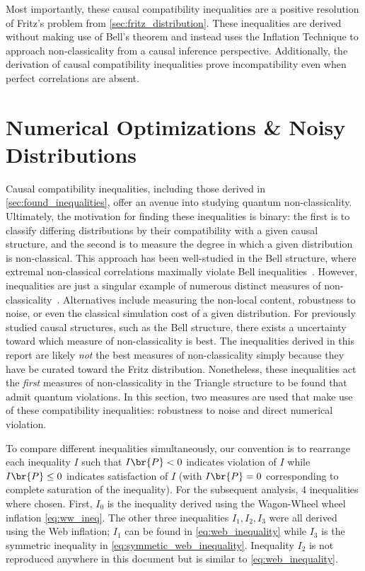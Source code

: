 \documentclass[aps, 10pt, english, twoside, pra, nofootinbib, tightenlines, longbibliography, superscriptaddress]{revtex4-1}
\begin{document}
    Most importantly, these causal compatibility inequalities are a positive resolution of Fritz's problem from \cref{sec:fritz_distribution}. These inequalities are derived without making use of Bell's theorem and instead uses the Inflation Technique to approach non-classicality from a causal inference perspective. Additionally, the derivation of causal compatibility inequalities prove incompatibility even when perfect correlations are absent.

    \section{Numerical Optimizations \& Noisy Distributions}
    \label{sec:violations_noise}
    Causal compatibility inequalities, including those derived in \cref{sec:found_inequalities}, offer an avenue into studying quantum non-classicality. Ultimately, the motivation for finding these inequalities is binary: the first is to classify differing distributions by their compatibility with a given causal structure, and the second is to measure the degree in which a given distribution is non-classical. This approach has been well-studied in the Bell structure, where extremal non-classical correlations maximally violate Bell inequalities~\cite{PR_1995}. However, inequalities are just a singular example of numerous distinct measures of non-classicality~\cite[Section 5]{Vicente_2014}. Alternatives include measuring the non-local content, robustness to noise, or even the classical simulation cost of a given distribution. For previously studied causal structures, such as the Bell structure, there exists a uncertainty toward which measure of non-classicality is best. The inequalities derived in this report are likely \textit{not} the best measures of non-classicality simply because they have be curated toward the Fritz distribution. Nonetheless, these inequalities act the \textit{first} measures of non-classicality in the Triangle structure to be found that admit quantum violations. In this section, two measures are used that make use of these compatibility inequalities: robustness to noise and direct numerical violation.

    To compare different inequalities simultaneously, our convention is to rearrange each inequality $I$ such that $I\br{\prob} < 0$ indicates violation of $I$ while $I\br{\prob} \leq 0$ indicates satisfaction of $I$ (with $I\br{\prob} = 0$ corresponding to complete saturation of the inequality). For the subsequent analysis, $4$ inequalities where chosen. First, $I_0$ is the inequality derived using the Wagon-Wheel wheel inflation \cref{eq:ww_ineq}. The other three inequalities $I_1, I_2, I_3$ were all derived using the Web inflation; $I_1$ can be found in \cref{eq:web_inequality} while $I_3$ is the symmetric inequality in \cref{eq:symmetic_web_inequality}. Inequality $I_2$ is not reproduced anywhere in this document but is similar to \cref{eq:web_inequality}.
\end{document}
